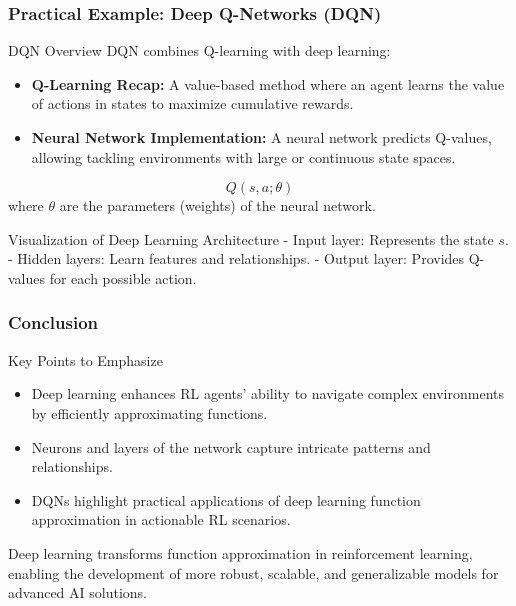 \documentclass[aspectratio=169]{beamer}
\begin{document}
\begin{frame}[fragile]
    \frametitle{Practical Example: Deep Q-Networks (DQN)}
    \begin{block}{DQN Overview}
        DQN combines Q-learning with deep learning:
        \begin{itemize}
            \item \textbf{Q-Learning Recap:} A value-based method where an agent learns the value of actions in states to maximize cumulative rewards.
            \item \textbf{Neural Network Implementation:} A neural network predicts Q-values, allowing tackling environments with large or continuous state spaces.
        \end{itemize}
    \end{block}
    
    \begin{equation}
        Q(s, a; \theta)
    \end{equation}
    where \( \theta \) are the parameters (weights) of the neural network.

    \begin{block}{Visualization of Deep Learning Architecture}
        - Input layer: Represents the state \( s \).
        - Hidden layers: Learn features and relationships.
        - Output layer: Provides Q-values for each possible action.
    \end{block}
\end{frame}

\begin{frame}[fragile]
    \frametitle{Conclusion}
    \begin{block}{Key Points to Emphasize}
        \begin{itemize}
            \item Deep learning enhances RL agents' ability to navigate complex environments by efficiently approximating functions.
            \item Neurons and layers of the network capture intricate patterns and relationships.
            \item DQNs highlight practical applications of deep learning function approximation in actionable RL scenarios.
        \end{itemize}
    \end{block}
    
    Deep learning transforms function approximation in reinforcement learning, enabling the development of more robust, scalable, and generalizable models for advanced AI solutions.
\end{frame}
\end{document}
